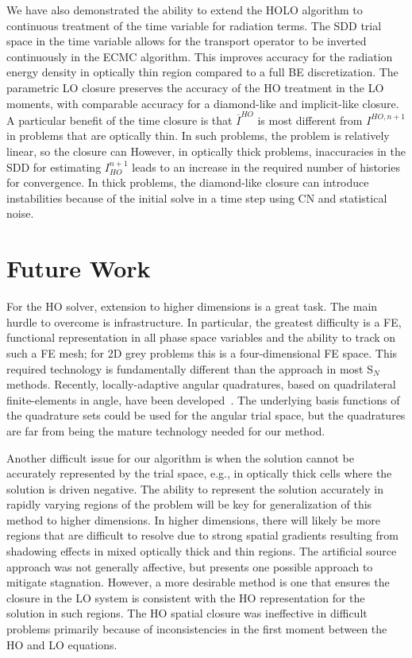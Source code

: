 We have also demonstrated the ability to extend the HOLO algorithm to
continuous treatment of the time variable for radiation terms.  The SDD trial
space in the time variable allows for the transport operator to be inverted
continuously in the ECMC algorithm.  This improves accuracy for the radiation
energy density in optically thin region compared to a full BE discretization.
The parametric LO closure preserves the accuracy of the HO treatment in the LO
moments, with comparable accuracy for a diamond-like and implicit-like closure.
A particular benefit of the time closure is that $\overline I^{HO}$ is most
different from $I^{HO,n+1}$ in problems that are optically thin.  In such
problems, the problem is relatively linear, so the closure can However, in
optically thick problems, inaccuracies in the SDD for estimating $I_{HO}^{n+1}$
leads to an increase in the required number of histories for convergence.  In
thick problems, the diamond-like closure can introduce instabilities because of
the initial solve in a time step using CN and statistical noise.

\section{Future Work} 


For the HO solver, extension to higher dimensions is a great task.  The main hurdle to
overcome is infrastructure.  In particular, the greatest difficulty is a FE, functional
representation in all phase space variables and the ability to
track on such a FE mesh; for 2D grey problems this is a four-dimensional FE space.  This
required technology is fundamentally different than the approach in most S$_N$ methods.  Recently, 
locally-adaptive angular quadratures, based on quadrilateral finite-elements in angle, have been developed~\cite{cheuk}.  
The underlying basis functions of the quadrature sets could be used for the angular trial space, but the quadratures are far from being
the mature technology needed for our method.

Another difficult issue for our algorithm is when the solution cannot be
accurately represented by the trial space, e.g., in optically thick cells where the
solution is driven negative. The ability to represent the solution accurately in
rapidly varying regions of the problem will be key for generalization of this method to
higher dimensions.  In higher dimensions, there will likely be more regions
that are difficult to resolve due to strong spatial gradients resulting from shadowing
effects in mixed optically thick and thin regions.   The artificial source approach was
not generally affective, but presents one possible approach to mitigate stagnation.
However, a more desirable method is one that ensures the closure in the LO system is consistent with the HO representation
for the solution in such regions.  The HO spatial closure was ineffective in difficult
problems primarily because of inconsistencies in the first moment between the HO and LO equations. 


